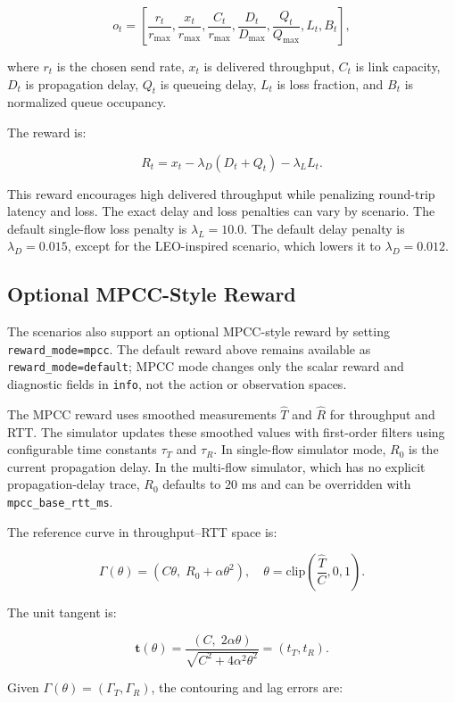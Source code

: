 \documentclass[11pt]{article}
\begin{document}
\[
o_t =
\left[
\frac{r_t}{r_{\max}},
\frac{x_t}{r_{\max}},
\frac{C_t}{r_{\max}},
\frac{D_t}{D_{\max}},
\frac{Q_t}{Q_{\max}},
L_t,
B_t
\right],
\]

where \(r_t\) is the chosen send rate, \(x_t\) is delivered throughput, \(C_t\)
is link capacity, \(D_t\) is propagation delay, \(Q_t\) is queueing delay,
\(L_t\) is loss fraction, and \(B_t\) is normalized queue occupancy.

The reward is:

\[
R_t = x_t - \lambda_D (D_t + Q_t) - \lambda_L L_t.
\]

This reward encourages high delivered throughput while penalizing round-trip
latency and loss. The exact delay and loss penalties can vary by scenario. The
default single-flow loss penalty is \(\lambda_L = 10.0\). The default delay
penalty is \(\lambda_D = 0.015\), except for the LEO-inspired scenario, which
lowers it to \(\lambda_D = 0.012\).

\subsection{Optional MPCC-Style Reward}

The scenarios also support an optional MPCC-style reward by setting
\texttt{reward\_mode=mpcc}. The default reward above remains available as
\texttt{reward\_mode=default}; MPCC mode changes only the scalar reward and
diagnostic fields in \texttt{info}, not the action or observation spaces.

The MPCC reward uses smoothed measurements \(\hat{T}\) and \(\hat{R}\) for
throughput and RTT. The simulator updates these smoothed values with first-order
filters using configurable time constants \(\tau_T\) and \(\tau_R\). In
single-flow simulator mode, \(R_0\) is the current propagation delay. In the
multi-flow simulator, which has no explicit propagation-delay trace, \(R_0\)
defaults to \(20\) ms and can be overridden with
\texttt{mpcc\_base\_rtt\_ms}.

The reference curve in throughput--RTT space is:

\[
\Gamma(\theta) =
\left(C\theta,\; R_0 + \alpha\theta^2\right),
\quad
\theta = \mathrm{clip}\left(\frac{\hat{T}}{C}, 0, 1\right).
\]

The unit tangent is:

\[
\mathbf{t}(\theta) =
\frac{(C,\;2\alpha\theta)}
{\sqrt{C^2 + 4\alpha^2\theta^2}}
= (t_T,t_R).
\]

Given \(\Gamma(\theta)=(\Gamma_T,\Gamma_R)\), the contouring and lag errors are:
\end{document}
